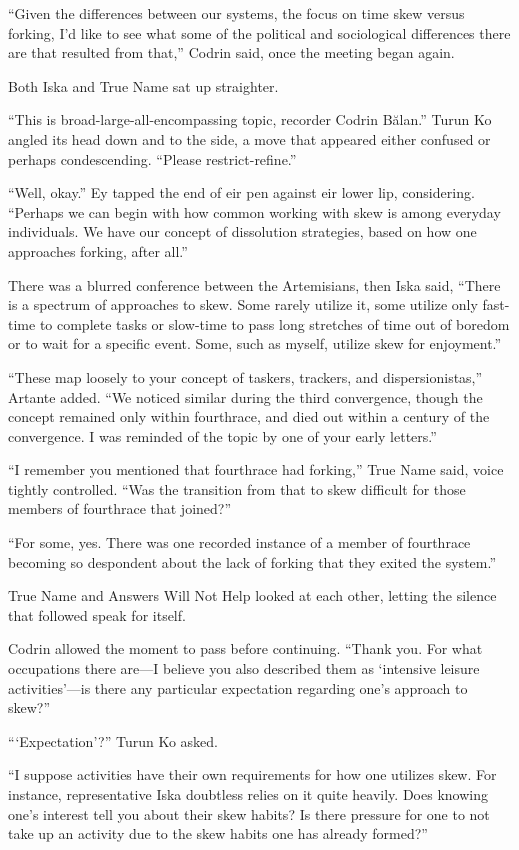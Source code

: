 ``Given the differences between our systems, the focus on time skew versus forking, I'd like to see what some of the political and sociological differences there are that resulted from that,'' Codrin said, once the meeting began again.

Both Iska and True Name sat up straighter.

``This is broad-large-all-encompassing topic, recorder Codrin Bălan.'' Turun Ko angled its head down and to the side, a move that appeared either confused or perhaps condescending. ``Please restrict-refine.''

``Well, okay.'' Ey tapped the end of eir pen against eir lower lip, considering. ``Perhaps we can begin with how common working with skew is among everyday individuals. We have our concept of dissolution strategies, based on how one approaches forking, after all.''

There was a blurred conference between the Artemisians, then Iska said, ``There is a spectrum of approaches to skew. Some rarely utilize it, some utilize only fast-time to complete tasks or slow-time to pass long stretches of time out of boredom or to wait for a specific event. Some, such as myself, utilize skew for enjoyment.''

``These map loosely to your concept of taskers, trackers, and dispersionistas,'' Artante added. ``We noticed similar during the third convergence, though the concept remained only within fourthrace, and died out within a century of the convergence. I was reminded of the topic by one of your early letters.''

``I remember you mentioned that fourthrace had forking,'' True Name said, voice tightly controlled. ``Was the transition from that to skew difficult for those members of fourthrace that joined?''

``For some, yes. There was one recorded instance of a member of fourthrace becoming so despondent about the lack of forking that they exited the system.''

True Name and Answers Will Not Help looked at each other, letting the silence that followed speak for itself.

Codrin allowed the moment to pass before continuing. ``Thank you. For what occupations there are—I believe you also described them as `intensive leisure activities'—is there any particular expectation regarding one's approach to skew?''

```Expectation'?'' Turun Ko asked.

``I suppose activities have their own requirements for how one utilizes skew. For instance, representative Iska doubtless relies on it quite heavily. Does knowing one's interest tell you about their skew habits? Is there pressure for one to not take up an activity due to the skew habits one has already formed?''

